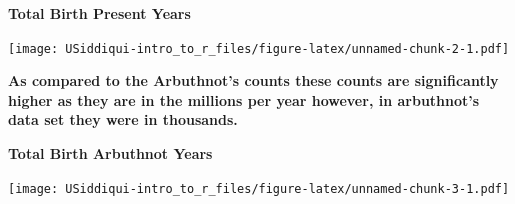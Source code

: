 \documentclass[
]{article}
\newenvironment{Shaded}{\begin{snugshade}}{\end{snugshade}}
\newcommand{\KeywordTok}[1]{\textcolor[rgb]{0.13,0.29,0.53}{\textbf{#1}}}
\newcommand{\NormalTok}[1]{#1}
\newcommand{\OperatorTok}[1]{\textcolor[rgb]{0.81,0.36,0.00}{\textbf{#1}}}
\newcommand{\StringTok}[1]{\textcolor[rgb]{0.31,0.60,0.02}{#1}}
\begin{document}
\textbf{Total Birth Present Years}

\begin{Shaded}
\end{Shaded}

\texttt{[image: USiddiqui-intro\_to\_r\_files/figure-latex/unnamed-chunk-2-1.pdf]}

\textbf{As compared to the Arbuthnot's counts these counts are
significantly higher as they are in the millions per year however, in
arbuthnot's data set they were in thousands.}

\textbf{Total Birth Arbuthnot Years}

\begin{Shaded}
\end{Shaded}

\texttt{[image: USiddiqui-intro\_to\_r\_files/figure-latex/unnamed-chunk-3-1.pdf]}
\end{document}
